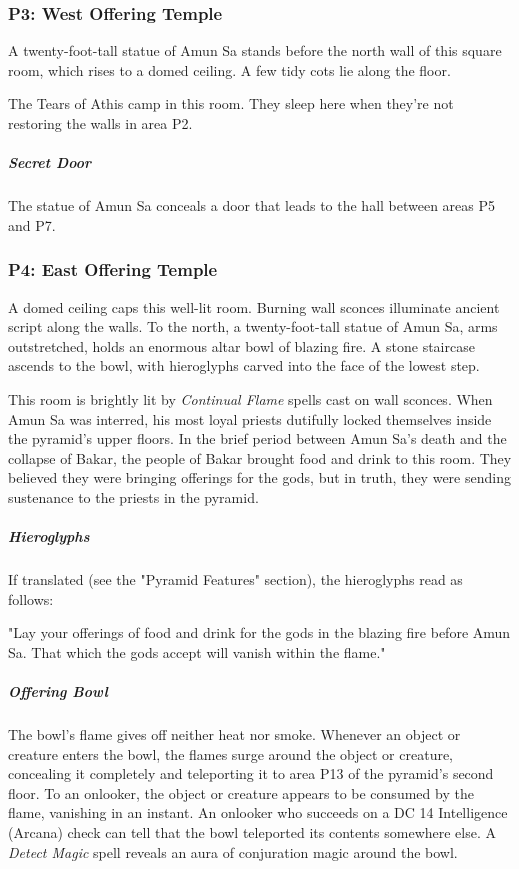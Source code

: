 \documentclass[10pt,a4paper,twoside,bg=print,twocolumn,openany,nodeprecatedcode]{dndbook}
\begin{document}
\subsubsection{P3: West Offering Temple}
\begin{DndReadAloud}{}
A twenty-foot-tall statue of Amun Sa stands before the north wall of this square room, which rises to a domed ceiling. A few tidy cots lie along the floor.

\end{DndReadAloud}

The Tears of Athis camp in this room. They sleep here when they're not restoring the walls in area P2.

\subparagraph{Secret Door}
The statue of Amun Sa conceals a door that leads to the hall between areas P5 and P7.

\subsubsection{P4: East Offering Temple}
\begin{DndReadAloud}{}
A domed ceiling caps this well-lit room. Burning wall sconces illuminate ancient script along the walls. To the north, a twenty-foot-tall statue of Amun Sa, arms outstretched, holds an enormous altar bowl of blazing fire. A stone staircase ascends to the bowl, with hieroglyphs carved into the face of the lowest step.

\end{DndReadAloud}

This room is brightly lit by \textit{Continual Flame} spells cast on wall sconces. When Amun Sa was interred, his most loyal priests dutifully locked themselves inside the pyramid's upper floors. In the brief period between Amun Sa's death and the collapse of Bakar, the people of Bakar brought food and drink to this room. They believed they were bringing offerings for the gods, but in truth, they were sending sustenance to the priests in the pyramid.

\subparagraph{Hieroglyphs}
If translated (see the "Pyramid Features" section), the hieroglyphs read as follows:

\begin{DndReadAloud}{}
"Lay your offerings of food and drink for the gods in the blazing fire before Amun Sa. That which the gods accept will vanish within the flame."

\end{DndReadAloud}

\subparagraph{Offering Bowl}
The bowl's flame gives off neither heat nor smoke. Whenever an object or creature enters the bowl, the flames surge around the object or creature, concealing it completely and teleporting it to area P13 of the pyramid's second floor. To an onlooker, the object or creature appears to be consumed by the flame, vanishing in an instant. An onlooker who succeeds on a DC 14 Intelligence (Arcana) check can tell that the bowl teleported its contents somewhere else. A \textit{Detect Magic} spell reveals an aura of conjuration magic around the bowl.
\end{document}
